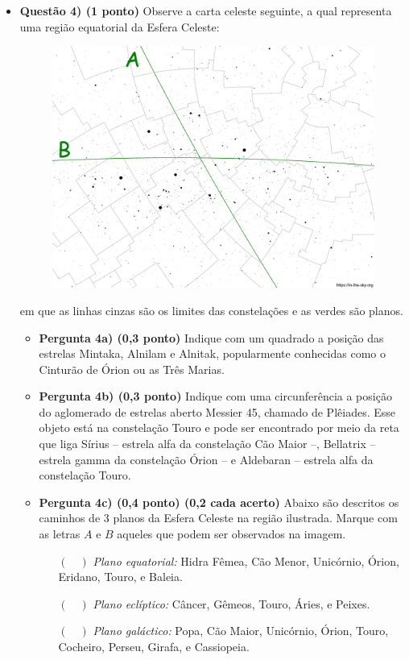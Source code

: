 \documentclass[a4paper, 12pt]{article}
\begin{document}
\begin{flushleft}
\begin{itemize}
		\item \textbf{Questão 4) (1 ponto)} Observe a carta celeste seguinte, a qual representa uma região equatorial da Esfera Celeste:
			\begin{figure}[H]
				\centering
				\includegraphics[scale=0.5]{./img/4.png}
			\end{figure}
			em que as linhas cinzas são os limites das constelações e as verdes são planos.
			\begin{itemize}
				\item \textbf{Pergunta 4a) (0,3 ponto)} Indique com um quadrado a posição das estrelas Mintaka, Alnilam e Alnitak, popularmente conhecidas como o Cinturão de Órion ou as Três Marias.
				\item \textbf{Pergunta 4b) (0,3 ponto)} Indique com uma circunferência a posição do aglomerado de estrelas aberto Messier 45, chamado de Plêiades. Esse objeto está na constelação Touro e pode ser encontrado por meio da reta que liga Sírius -- estrela alfa da constelação Cão Maior --, Bellatrix -- estrela gamma da constelação Órion -- e Aldebaran -- estrela alfa da constelação Touro.
				\item \textbf{Pergunta 4c) (0,4 ponto) (0,2 cada acerto)} Abaixo são descritos os caminhos de 3 planos da Esfera Celeste na região ilustrada. Marque com as letras $A$ e $B$ aqueles que podem ser observados na imagem.
					\begin{itemize}
						\item[$(\quad)$] \textit{Plano equatorial:} Hidra Fêmea, Cão Menor, Unicórnio, Órion, Eridano, Touro, e Baleia.
						\item[$(\quad)$] \textit{Plano eclíptico:} Câncer, Gêmeos, Touro, Áries, e Peixes.
						\item[$(\quad)$] \textit{Plano galáctico:} Popa, Cão Maior, Unicórnio, Órion, Touro, Cocheiro, Perseu, Girafa, e Cassiopeia.
					\end{itemize}
			\end{itemize}
				

\end{itemize}
\end{flushleft}
\end{document}
